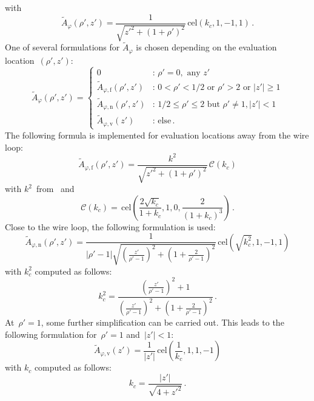 with
\begin{equation}
  \tilde{A}_\varphi(\rho',z')
  = \frac{1}{\sqrt{z'^2 + (1 + \rho')^2}} \,\mathrm{cel}(k_c, 1, -1, 1) \, .
\end{equation}
One of several formulations for $\tilde{A}_\varphi$ is chosen depending on the evaluation location~$(\rho', z')$:
\begin{equation}
  \tilde{A}_\varphi (\rho', z') =
  \begin{cases}
    0                                          &:\, \rho' = 0 , \textrm{ any } z' \\
    \tilde{A}_{\varphi,\mathrm{f}} (\rho', z') &:\, 0 < \rho' < 1/2 \textrm{ or } \rho' > 2 \textrm{ or } |z'| \geq 1 \\
    \tilde{A}_{\varphi,\mathrm{n}} (\rho', z') &:\, 1/2 \leq \rho' \leq 2 \textrm{ but } \rho' \neq 1, |z'| < 1 \\
    \tilde{A}_{\varphi,\mathrm{v}} (z')        &:\, \textrm{else} \, .
  \end{cases} \label{eqn:A_phi_final}
\end{equation}
The following formula is implemented for evaluation locations away from the wire loop:
\begin{equation}
  \tilde{A}_{\varphi,\mathrm{f}} (\rho',z')
  = \frac{k^2}{\sqrt{z'^2 + (1 + \rho')^2}} \,\mathcal{C}(k_c) \label{eqn:cwl_A_phi_f}
\end{equation}
with $k^2$~from~ and
\begin{equation}
  \mathcal{C}(k_c)
  = \,\mathrm{cel} \left( \frac{2 \sqrt{k_c}}{1 + k_c}, 1, 0, \frac{2}{(1 + k_c)^3} \right) \, . \label{eqn:elliptic_c}
\end{equation}
Close to the wire loop, the following formulation is used:
\begin{equation}
  \tilde{A}_{\varphi,\mathrm{n}} (\rho',z')
  = \frac{1}{|\rho' - 1| \sqrt{\left( \frac{z'}{\rho'-1} \right)^2 + \left(1 + \frac{2}{\rho'-1} \right)^2 }}
    \,\mathrm{cel}(\sqrt{k_c^2}, 1, -1, 1) \label{eqn:cwl_A_phi_n}
\end{equation}
with $k_c^2$ computed as follows:
\begin{equation}
  k_c^2 = \frac{\left( \frac{z'}{\rho'-1} \right)^2 + 1}{\left( \frac{z'}{\rho'-1} \right)^2 + \left(1 + \frac{2}{\rho'-1} \right)^2} \, .
\end{equation}
At~$\rho' = 1$, some further simplification can be carried out.
This leads to the following formulation for~$\rho' = 1$ and~$|z'| < 1$:
\begin{equation}
  \tilde{A}_{\varphi,\mathrm{v}} (z') = \frac{1}{|z'|} \,\mathrm{cel}\left(\frac{1}{k_c}, 1, 1, -1\right) \label{eqn:cwl_A_phi_v}
\end{equation}
with $k_c$ computed as follows:
\begin{equation}
  k_c = \frac{|z'|}{\sqrt{4 + {z'}^2}} \, .
\end{equation}

